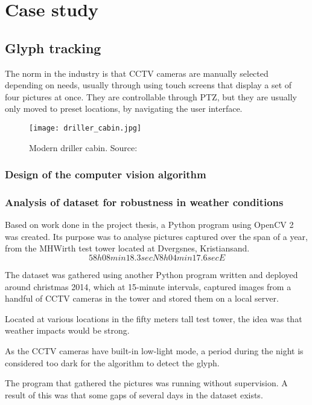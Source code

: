 \chapter{Case study}
\section{Glyph tracking}
The norm in the industry is that CCTV cameras are manually selected depending on needs, usually through using touch screens that display a set of four pictures at once. They are controllable through PTZ, but they are usually only moved to preset locations, by navigating the user interface.

\begin{figure}[ht]
    \centering
    \texttt{[image: driller\_cabin.jpg]}
    \caption{Modern driller cabin. Source:\cite{}}
    \label{fig:}
\end{figure}
\FloatBarrier

\subsection{Design of the computer vision algorithm}


\subsection{Analysis of dataset for robustness in weather conditions}
Based on work done in the project thesis, a Python program using OpenCV 2 was created. Its purpose was to analyse pictures captured over the span of a year, from the MHWirth test tower located at Dvergsnes, Kristiansand.
\begin{equation}
58h 08min 18.3sec N 8h 04min 17.6sec E
\end{equation}

The dataset was gathered using another Python program written and deployed around christmas 2014, which at 15-minute intervals, captured images from a handful of CCTV cameras in the tower and stored them on a local server.

Located at various locations in the fifty meters tall test tower, the idea was that weather impacts would be strong.

As the CCTV cameras have built-in low-light mode, a period during the night is considered too dark for the algorithm to detect the glyph.

The program that gathered the pictures was running without supervision. A result of this was that some gaps of several days in the dataset exists.

